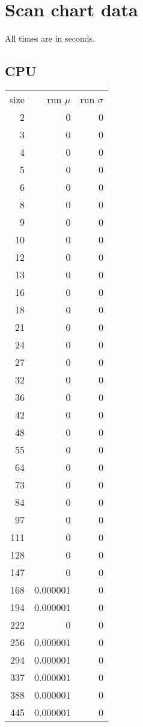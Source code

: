 \section{Scan chart data}
\label{sec:scan_chart_data}

All times are in seconds.

\subsection*{CPU}

\begin{longtable}{r r r}
size & run $\mu$ & run $\sigma$ \\
2 & 0 & 0 \\
3 & 0 & 0 \\
4 & 0 & 0 \\
5 & 0 & 0 \\
6 & 0 & 0 \\
8 & 0 & 0 \\
9 & 0 & 0 \\
10 & 0 & 0 \\
12 & 0 & 0 \\
13 & 0 & 0 \\
16 & 0 & 0 \\
18 & 0 & 0 \\
21 & 0 & 0 \\
24 & 0 & 0 \\
27 & 0 & 0 \\
32 & 0 & 0 \\
36 & 0 & 0 \\
42 & 0 & 0 \\
48 & 0 & 0 \\
55 & 0 & 0 \\
64 & 0 & 0 \\
73 & 0 & 0 \\
84 & 0 & 0 \\
97 & 0 & 0 \\
111 & 0 & 0 \\
128 & 0 & 0 \\
147 & 0 & 0 \\
168 & 0.000001 & 0 \\
194 & 0.000001 & 0 \\
222 & 0 & 0 \\
256 & 0.000001 & 0 \\
294 & 0.000001 & 0 \\
337 & 0.000001 & 0 \\
388 & 0.000001 & 0 \\
445 & 0.000001 & 0 \\

\end{longtable}
